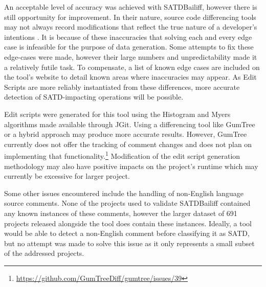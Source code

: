 \documentclass[3p]{elsarticle}
\newcommand{\approach}{SATDBailiff\xspace}
\begin{document}
An acceptable level of accuracy was achieved with \approach, however there is still opportunity for improvement. In their nature, source code differencing tools may not always record modifications that reflect the true nature of a developer's intentions \cite{Falleri}. It is because of these inaccuracies that solving each and every edge case is infeasible for the purpose of data generation. Some attempts to fix these edge-cases were made, however their large numbers and unpredictability made it a relatively futile task. To compensate, a list of known edge cases are included on the tool's website to detail known areas where inaccuracies may appear. As Edit Scripts are more reliably instantiated from these differences, more accurate detection of SATD-impacting operations will be possible.

Edit scripts were generated for this tool using the Histogram and Myers algorithms made available through JGit. Using a differencing tool like GumTree \cite{Falleri} or a hybrid approach  \cite{Matsumoto} may produce more accurate results. However, GumTree currently does not offer the tracking of comment changes and does not plan on implementing that functionality.\footnote{\url{https://github.com/GumTreeDiff/gumtree/issues/39}} Modification of the edit script generation methodology may also have positive impacts on the project's runtime which may currently be excessive for larger project.

Some other issues encountered include the handling of non-English language source comments. None of the projects used to validate \approach contained any known instances of these comments, however the larger dataset of 691 projects released alongside the tool does contain these instances. Ideally, a tool would be able to detect a non-English comment before classifying it as SATD, but no attempt was made to solve this issue as it only represents a small subset of the addressed projects.



%
\end{document}
